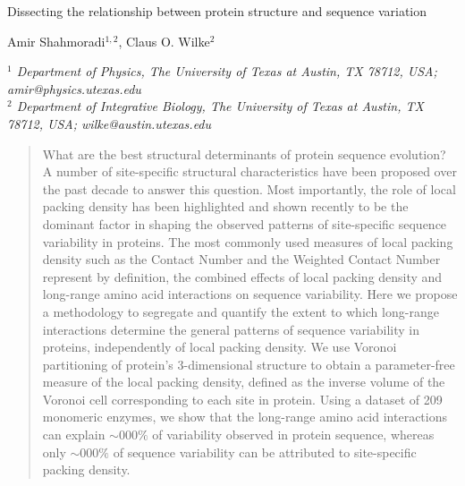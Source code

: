 \documentclass[11pt]{article}
\makeatletter
\newcommand\pubnumber{}
\newcommand\pubdate{\today}
\def\affiliation{$^1$ Department of Physics, The University of Texas at Austin, TX 78712, USA; amir@physics.utexas.edu \\
                 $^2$ Department of Integrative Biology, The University of Texas at Austin, TX 78712, USA; wilke@austin.utexas.edu
                 }
\def\Title#1{\begin{center} {\Large #1 } \end{center}}
\def\Author#1{\begin{center}{ \sc #1} \end{center}}
\def\Address#1{\begin{center}{ \it #1} \end{center}}
\newcommand\pubblock{\rightline{\begin{tabular}{l} \pubnumber\\
         \pubdate  \end{tabular}}}
\newenvironment{Abstract}{\begin{quotation}  }{\end{quotation}}
\makeatother
\begin{document}
\begin{titlepage}
\pubblock

\vfill
\Title{Dissecting the relationship between protein structure and sequence variation}
\vfill
\Author{Amir Shahmoradi$^{1,2}$, Claus O. Wilke$^2$}
\Address{\affiliation}
\vfill
\begin{Abstract}

    What are the best structural determinants of protein sequence evolution? A number of site-specific structural characteristics have been proposed over the past decade to answer this question. Most importantly, the role of local packing density has been highlighted and shown recently to be the dominant factor in shaping the observed patterns of site-specific sequence variability in proteins. The most commonly used measures of local packing density such as the Contact Number and the Weighted Contact Number represent by definition, the combined effects of local packing density and long-range amino acid interactions on sequence variability. Here we propose a methodology to segregate and quantify the extent to which long-range interactions determine the general patterns of sequence variability in proteins, independently of local packing density. We use Voronoi partitioning of protein's 3-dimensional structure to obtain a parameter-free measure of the local packing density, defined as the inverse volume of the Voronoi cell corresponding to each site in protein. Using a dataset of 209 monomeric enzymes, we show that the long-range amino acid interactions can explain $\sim000\%$ of variability observed in protein sequence, whereas only $\sim000\%$ of sequence variability can be attributed to site-specific packing density.


\end{Abstract}
\end{titlepage}
\end{document}
